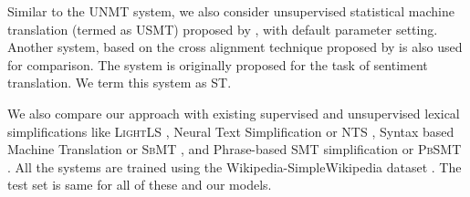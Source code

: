 \documentclass[11pt,a4paper]{article}
\begin{document}
Similar to the \textsc{UNMT} system, we also consider unsupervised statistical machine translation (termed as \textsc{USMT}) proposed by , with default parameter setting. Another system, based on the cross alignment technique proposed by  is also used for comparison. The system is originally proposed for the task of sentiment translation. We term this system as \textsc{ST}.

We also compare our approach with existing supervised and unsupervised lexical simplifications like \textsc{LightLS} \cite{glavavs2015simplifying}, Neural Text Simplification or \textsc{NTS} \cite{nisioi2017exploring}, Syntax based Machine Translation or \textsc{SbMT} \cite{xu2016optimizing}, and Phrase-based SMT simplification or \textsc{PbSMT} \cite{wubben2012sentence}. All the systems are trained using the Wikipedia-SimpleWikipedia dataset \cite{hwang2015aligning}. The test set is same for all of these and our models.




%
\end{document}
